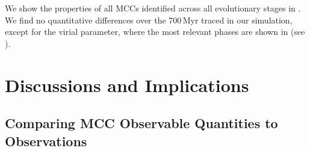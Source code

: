 \IfFileExists{emulateapjlegacy.cls}{\documentclass[iop]{emulateapjlegacy}}{\documentclass[iop]{emulateapj}}
\begin{document}


We show the properties of all MCCs identified across all evolutionary stages in . 
We find no quantitative differences over the 700\,Myr traced in our simulation, except 
for the virial parameter, where the most relevant phases are shown in  (see ).



\section{Discussions and Implications}\label{sec:diss}


\subsection{Comparing MCC Observable Quantities to Observations} \label{sec:diss1}
\end{document}
